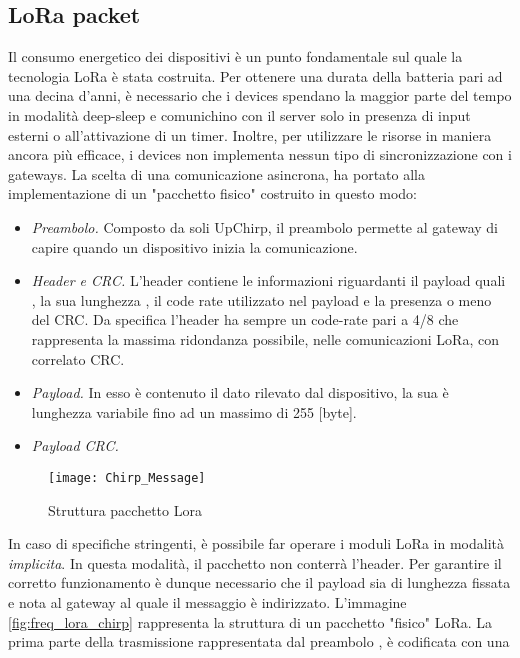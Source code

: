 \subsection{LoRa packet}
Il consumo energetico dei dispositivi è un punto fondamentale sul quale la
tecnologia LoRa è stata costruita.  Per ottenere una durata della batteria pari
ad una decina d'anni, è necessario che i devices spendano la maggior parte del
tempo in modalità deep-sleep e comunichino con il server solo in presenza di
input esterni o all'attivazione di un timer.  Inoltre, per utilizzare
le risorse in maniera ancora più efficace, i devices non implementa nessun tipo
di sincronizzazione con i gateways. La scelta di una comunicazione asincrona, ha
portato alla implementazione di un "pacchetto fisico" costruito in questo
modo:
\begin{itemize}
        \item   \emph{Preambolo.}  Composto da soli UpChirp, il preambolo permette al gateway
                di capire quando un dispositivo inizia la comunicazione.
        \item   \emph{Header e CRC.} L'header contiene le informazioni riguardanti
                il payload quali , la sua lunghezza , il code rate utilizzato nel
                payload e la presenza o meno del CRC. Da specifica l'header ha sempre
                un code-rate pari a 4/8 che rappresenta la massima ridondanza
                possibile, nelle comunicazioni LoRa, con
                correlato CRC. 
        \item   \emph{Payload.} In esso è contenuto il dato rilevato dal
                dispositivo, la sua è  lunghezza variabile fino ad
                un massimo di 255 [byte].
        \item   \emph{Payload CRC.}
\end{itemize}
\begin{figure}[ht]
        \centering 
                \texttt{[image: Chirp\_Message]}
        \caption{Struttura pacchetto Lora }
        \label{fig:phis_pack}
\end{figure}
In caso di specifiche stringenti, è possibile far operare i moduli LoRa in
modalità \emph{implicita}. In questa modalità, il pacchetto non conterrà
l'header. Per garantire il corretto funzionamento è dunque necessario che il
payload sia di lunghezza fissata e nota al gateway al quale il messaggio è
indirizzato.
L'immagine  \ref{fig:freq_lora_chirp} rappresenta la struttura di un  
pacchetto "fisico" LoRa.
La prima parte della trasmissione rappresentata dal  preambolo , è codificata con una

